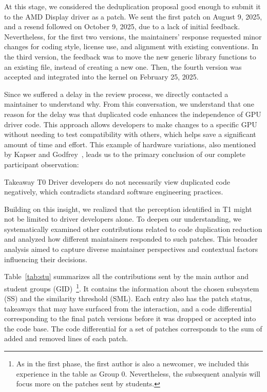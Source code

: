 \documentclass[10pt,conference]{IEEEtran}
\newenvironment{highlight-box}[1]{%
  \begin{tcolorbox}
  \textbf{#1:} \itshape}{\end{tcolorbox}}
\begin{document}
At this stage, we considered the deduplication proposal good enough to submit it to the AMD Display driver as a patch. We sent the first patch on August 9, 2025, and a resend followed on October 9, 2025, due to a lack of initial feedback. Nevertheless, for the first two versions, the maintainers' response requested minor changes for coding style, license use, and alignment with existing conventions. In the third version, the feedback was to move the new generic library functions to an existing file, instead of creating a new one. Then, the fourth version was accepted and integrated into the kernel on February 25, 2025.

Since we suffered a delay in the review process, we directly contacted a maintainer to understand why. From this conversation, we understand that one reason for the delay was that duplicated code enhances the independence of GPU driver code. This approach allows developers to make changes to a specific GPU without needing to test compatibility with others, which helps save a significant amount of time and effort. This example of hardware variations, also mentioned by Kapser and Godfrey~\cite{cloneharm}, leads us to the primary conclusion of our complete participant observation:
%
\begin{highlight-box}{Takeaway T0}
Driver developers do not necessarily view duplicated code negatively, which contradicts standard software engineering practices.
\end{highlight-box}

Building on this insight, we realized that the perception identified in T1 might not be limited to driver developers alone. To deepen our understanding, we systematically examined other contributions related to code duplication reduction and analyzed how different maintainers responded to such patches. This broader analysis aimed to capture diverse maintainer perspectives and contextual factors influencing their decisions.

Table~\ref{tab:stu} summarizes all the contributions sent by the main author and student groups (GID)~\footnote{As in the first phase, the first author is also a newcomer, we included this experience in the table as Group 0. Nevertheless, the subsequent analysis will focus more on the patches sent by students.}. It contains the information about the chosen subsystem (SS) and the similarity threshold (SML). Each entry also has the patch status, takeaways that may have surfaced from the interaction, and a code differential corresponding to the final patch versions before it was dropped or accepted into the code base. The code differential for a set of patches corresponds to the sum of added and removed lines of each patch.
\end{document}
